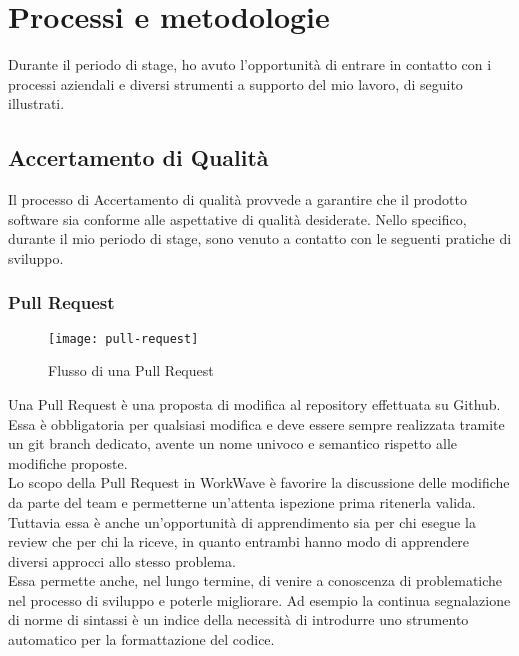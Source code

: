 
\chapter{Processi e metodologie}
\label{cap:processi-metodologie}

Durante il periodo di stage, ho avuto l'opportunità di entrare in contatto con i processi aziendali e diversi strumenti a supporto del mio lavoro, di seguito illustrati.

\section{Accertamento di Qualità}

Il processo di Accertamento di qualità provvede a garantire che il prodotto software sia conforme alle aspettative di qualità desiderate. Nello specifico, durante il mio periodo di stage, sono venuto a contatto con le seguenti pratiche di sviluppo.

\subsection{Pull Request}

\begin{figure}[H] 
  \centering 
  \texttt{[image: pull-request]} 
  \caption{Flusso di una Pull Request}
\end{figure}

Una Pull Request è una proposta di modifica al repository effettuata su Github. Essa è obbligatoria per qualsiasi modifica e deve essere sempre realizzata tramite un git branch dedicato, avente un nome univoco e semantico rispetto alle modifiche proposte. \\

Lo scopo della Pull Request in WorkWave è favorire la discussione delle modifiche da parte del team e permetterne un'attenta ispezione prima ritenerla valida. Tuttavia essa è anche un'opportunità di apprendimento sia per chi esegue la review che per chi la riceve, in quanto entrambi hanno modo di apprendere diversi approcci allo stesso problema. \\

Essa permette anche, nel lungo termine, di venire a conoscenza di problematiche nel processo di sviluppo e poterle migliorare. Ad esempio la continua segnalazione di norme di sintassi è un indice della necessità di introdurre uno strumento automatico per la formattazione del codice.

